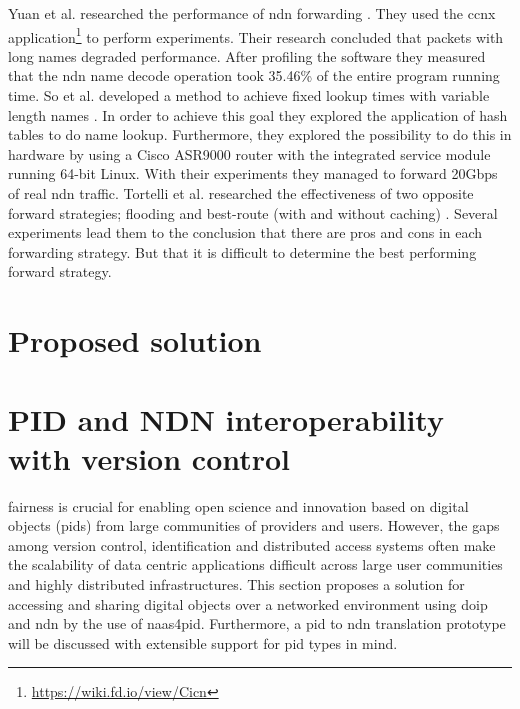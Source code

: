 \documentclass[conference]{IEEEtran}
\begin{document}
Yuan et al. researched the performance of \gls{ndn} forwarding \cite{yuan2012scalable}. They used the \gls{ccnx} application\footnote{\url{https://wiki.fd.io/view/Cicn}} to perform experiments. Their research concluded that packets with long names degraded performance. After profiling the software they measured that the \gls{ndn} name decode operation took 35.46\% of the entire program running time. So et al. developed a method to achieve fixed lookup times with variable length names \cite{so2013named}. In order to achieve this goal they explored the application of hash tables to do name lookup. Furthermore, they explored the possibility to do this in hardware by using a Cisco ASR9000 router with the integrated service module running 64-bit Linux. With their experiments they managed to forward 20Gbps of real \gls{ndn} traffic. Tortelli et al. researched the effectiveness of two opposite forward strategies; flooding and best-route (with and without caching) \cite{tortelli2013performance}. Several experiments lead them to the conclusion that there are pros and cons in each forwarding strategy. But that it is difficult to determine the best performing forward strategy.

\section{Proposed solution}

\section{PID and NDN interoperability with version control}
\label{pid-interoperability}
\gls{fairness} is crucial for enabling open science and innovation based on digital objects (\glspl{pid}) from large communities of providers and users. However, the gaps among version control, identification and distributed access systems often make the scalability of data centric applications difficult across large user communities and highly distributed infrastructures. This section proposes a solution for accessing and sharing digital objects over a networked environment using \gls{doip} and \gls{ndn} by the use of \gls{naas4pid}. Furthermore, a \gls{pid} to \gls{ndn} translation prototype will be discussed with extensible support for \gls{pid} types in mind.
\end{document}
